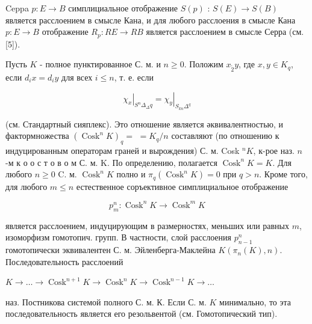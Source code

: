 \documentclass[10pt]{article}
\begin{document}
Ceppa $p: E \rightarrow B$ симплициальное отображение $S(p)$ : $S(E) \rightarrow S(B)$ является расслоением в смысле Кана, и для любого расслоения в смысле Кана $p: E \rightarrow B$ отображение $R_{p}: R E \rightarrow R B$ является расслоением в смысле Серра (см. [5]).



Пусть $K$ - полное пунктированное С. м. и $n \geqslant 0$. Положим $x_{\tilde{2}} y$, где $x, y \in K_{q}$, если $d_{i} x=d_{i} y$ для всех $i \leqslant n$, т. е. если



\[

\left.\chi_{x}\right|_{S^{n} \Delta_{\Delta} q}=\left.\chi_{y}\right|_{S_{k n} \Delta^{q}}

\]



(см. Стандартный сияплекс). Это отношение является әквивалентностью, и фактормножества $\left(\operatorname{Cosk}^{n} K\right)_{q}=$ $=K_{q} / n$ составляют (по отношению к индуцированным операторам граней и вырождения) С. м. Cosk ${ }^{n} K$, к-рое наз. $n$-м к о о с т о в о м С. м. K. По определению, полагается $\operatorname{Cosk}^{n} K=K$. Для любого $n \geqslant 0$ C. м. $\operatorname{Cosk}^{n} K$ полно и $\pi_{q}\left(\operatorname{Cosk}^{n} K\right)=0$ при $q>n$. Кроме того, для любого $m \leqslant n$ естественное соръективное симплициальное отображение



\[

p_{m}^{n}: \operatorname{Cosk}^{n} K \longrightarrow \operatorname{Cosk}^{m} K

\]



является расслоением, индуцирующим в размерностях, меньших или равных $m$, изоморфизм гомотопич. групп. В частности, слой расслоения $p_{n-1}^{n}$ гомотопически эквивалентен С. м. Эйленберга-Маклейна $K\left(\pi_{n}(K), n\right)$. Последовательность расслоений



$K \longrightarrow \ldots \longrightarrow \operatorname{Cosk}^{n+1} K \longrightarrow \operatorname{Cosk}^{n} K \longrightarrow \operatorname{Cosk}^{n-1} K \longrightarrow \ldots$



наз. Постникова системой полного С. м. К. Если С. м. $K$ минимально, то эта последовательность является его резольвентой (см. Гомотопический тип).
\end{document}
